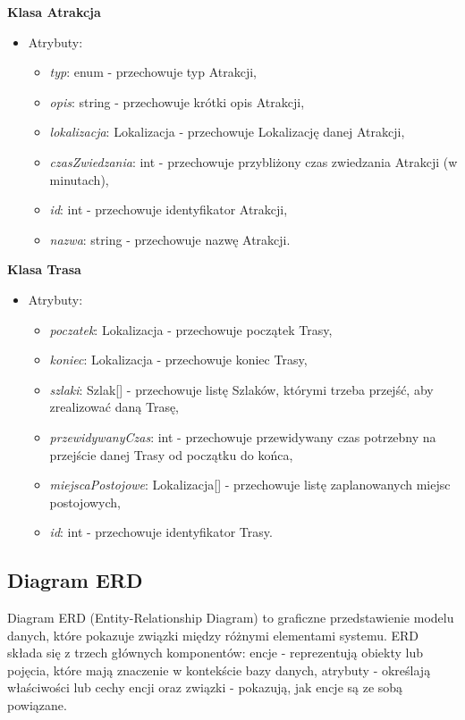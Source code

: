     \textbf{Klasa Atrakcja}
    \begin{itemize}
        \item []Atrybuty:
        \begin{itemize}
            \item \textit{typ}: enum - przechowuje typ Atrakcji,
            \item \textit{opis}: string - przechowuje krótki opis Atrakcji,
            \item \textit{lokalizacja}: Lokalizacja - przechowuje Lokalizację danej Atrakcji,
            \item \textit{czasZwiedzania}: int - przechowuje przybliżony czas zwiedzania Atrakcji (w minutach),
            \item \textit{id}: int - przechowuje identyfikator Atrakcji,
            \item \textit{nazwa}: string - przechowuje nazwę Atrakcji.
        \end{itemize}
    \end{itemize}
    \textbf{Klasa Trasa}
    \begin{itemize}
        \item []Atrybuty:
        \begin{itemize}
            \item \textit{poczatek}: Lokalizacja - przechowuje początek Trasy,
            \item \textit{koniec}: Lokalizacja - przechowuje koniec Trasy,
            \item \textit{szlaki}: Szlak[] - przechowuje listę Szlaków, którymi trzeba przejść, aby zrealizować daną Trasę,
            \item \textit{przewidywanyCzas}: int - przechowuje przewidywany czas potrzebny na przejście danej Trasy od początku do końca,
            \item \textit{miejscaPostojowe}: Lokalizacja[] - przechowuje listę zaplanowanych miejsc postojowych,
            \item \textit{id}: int - przechowuje identyfikator Trasy.
        \end{itemize}
    \end{itemize}

     \subsection{Diagram ERD}
   Diagram ERD (Entity-Relationship Diagram) to graficzne przedstawienie modelu danych, które pokazuje związki między różnymi elementami systemu. ERD składa się z trzech głównych komponentów: encje - reprezentują obiekty lub pojęcia, które mają znaczenie w kontekście bazy danych, atrybuty - określają właściwości lub cechy encji oraz związki - pokazują, jak encje są ze sobą powiązane.

